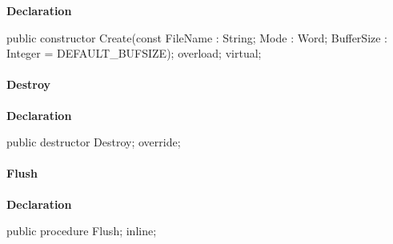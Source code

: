 \documentclass{report}
\newif\ifpdf
\begin{document}
\label{PasDoc_StreamUtils.TBufferedStream-Create}
\begin{list}{}{
\setlength{\itemindent}{0cm}
\setlength{\listparindent}{0cm}
\setlength{\leftmargin}{\evensidemargin}
\addtolength{\leftmargin}{\tmplength}
\settowidth{\labelsep}{X}
\addtolength{\leftmargin}{\labelsep}
\setlength{\labelwidth}{\tmplength}
}
\item[\textbf{Declaration}\hfill]
\ifpdf
\begin{flushleft}
\fi
\begin{ttfamily}
public constructor Create(const FileName : String; Mode : Word; BufferSize : Integer = DEFAULT{\_}BUFSIZE); overload; virtual;\end{ttfamily}

\ifpdf
\end{flushleft}
\fi

\end{list}
\paragraph*{Destroy}\hspace*{\fill}

\label{PasDoc_StreamUtils.TBufferedStream-Destroy}
\begin{list}{}{
\setlength{\itemindent}{0cm}
\setlength{\listparindent}{0cm}
\setlength{\leftmargin}{\evensidemargin}
\addtolength{\leftmargin}{\tmplength}
\settowidth{\labelsep}{X}
\addtolength{\leftmargin}{\labelsep}
\setlength{\labelwidth}{\tmplength}
}
\item[\textbf{Declaration}\hfill]
\ifpdf
\begin{flushleft}
\fi
\begin{ttfamily}
public destructor Destroy; override;\end{ttfamily}

\ifpdf
\end{flushleft}
\fi

\end{list}
\paragraph*{Flush}\hspace*{\fill}

\label{PasDoc_StreamUtils.TBufferedStream-Flush}
\begin{list}{}{
\setlength{\itemindent}{0cm}
\setlength{\listparindent}{0cm}
\setlength{\leftmargin}{\evensidemargin}
\addtolength{\leftmargin}{\tmplength}
\settowidth{\labelsep}{X}
\addtolength{\leftmargin}{\labelsep}
\setlength{\labelwidth}{\tmplength}
}
\item[\textbf{Declaration}\hfill]
\ifpdf
\begin{flushleft}
\fi
\begin{ttfamily}
public procedure Flush; inline;\end{ttfamily}

\ifpdf
\end{flushleft}
\fi

\end{list}
\end{document}
